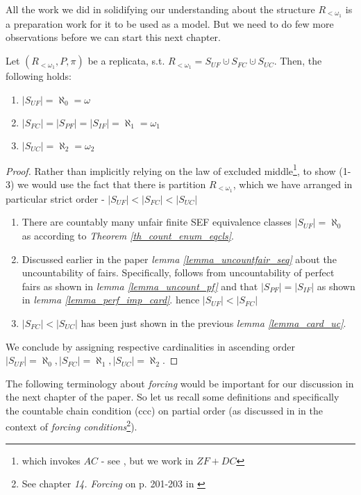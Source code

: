 All the work we did in solidifying our understanding about the structure $R_{<\omega_1}$ is a preparation work for it to be used as a model. But we need to do few more observations before we can start this next chapter.

\begin{corollary}\label{corollary_card_rep_part}
  Let $(R_{<\omega_1}, P, \pi)$ be a replicata, s.t. $R_{<\omega_1} = S_{UF} \cupdot S_{FC} \cupdot  S_{UC}$.
  Then, the following holds:
  \begin{enumerate}
    \item $|S_{UF}| = \aleph_0 = \omega$
    \item $|S_{FC}| = |S_{PF}| = |S_{IF}| = \aleph_1  = \omega_1$
    \item $|S_{UC}| = \aleph_2  = \omega_2$
  \end{enumerate}
\end{corollary}
\begin{proof}
  Rather than implicitly relying on the law of excluded middle\footnote{which invokes $AC$ - see \cite{Gillman2002}, but we work in $ZF+DC$}, to show (1-3) we would use the fact that there is partition $R_{<\omega_1}$, which we have arranged in particular strict order - $|S_{UF}| < |S_{FC}| < |S_{UC}|$ 
  \begin{enumerate}[ {(}1{)} ]
    \item There are countably many unfair finite SEF equivalence classes $|S_{UF}| = \aleph_0$ as according to \textit{Theorem \ref{th_count_enum_eqcls}}.
    \item Discussed earlier in the paper \textit{lemma \ref{lemma_uncountfair_seq}} about the uncountability of fairs. Specifically, follows from uncountability of perfect fairs as shown in \textit{lemma \ref{lemma_uncount_pf}} and that $|S_{PF}| = |S_{IF}|$ as shown in \textit{lemma \ref{lemma_perf_imp_card}}. hence  $ |S_{UF}| < |S_{FC}|$
    \item $|S_{FC}| < |S_{UC}|$ has been just shown in the previous \textit{lemma \ref{lemma_card_uc}}.
  \end{enumerate}
  We conclude by assigning respective cardinalities in ascending order $|S_{UF}| = \aleph_0, |S_{FC}|  = \aleph_1, |S_{UC}| = \aleph_2$.
\end{proof}

The following terminology about \textit{forcing} would be important for our discussion in the next chapter of the paper.
So let us recall some definitions and specifically the countable chain condition (ccc) on partial order (as discussed in \cite{jech2003set} in the context of \textit{forcing conditions}\footnote{See chapter \textit{14. Forcing} on p. 201-203 in \cite{jech2003set}}). 

